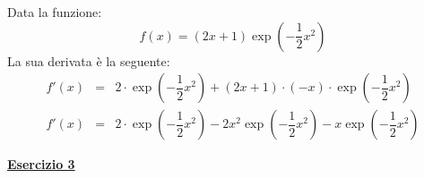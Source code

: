 \documentclass[a4paper]{article}
\newcommand{\example}[1]{\textcolor{Green4}{\textbf{#1}}}
\begin{document}
	\noindent
	Data la funzione:
	\begin{equation*}
		f\left(x\right) = \left(2x+1\right) \exp\left(-\dfrac{1}{2}x^{2}\right)
	\end{equation*}
	La sua derivata è la seguente:
	\begin{equation*}
		\begin{array}{rcl}
			f'\left(x\right) &=& 2 \cdot \exp\left(-\dfrac{1}{2}x^{2}\right) + \left(2x+1\right) \cdot \left(-x\right) \cdot \exp\left(-\dfrac{1}{2}x^{2}\right)\\ [2em]
			f'\left(x\right) &=& 2 \cdot \exp\left(-\dfrac{1}{2}x^{2}\right) - 2x^{2}\exp\left(-\dfrac{1}{2}x^{2}\right) - x\exp\left(-\dfrac{1}{2}x^{2}\right)
		\end{array}
	\end{equation*}\newpage

	\begin{flushleft}
		\example{\underline{Esercizio 3}}
	\end{flushleft}
\end{document}
